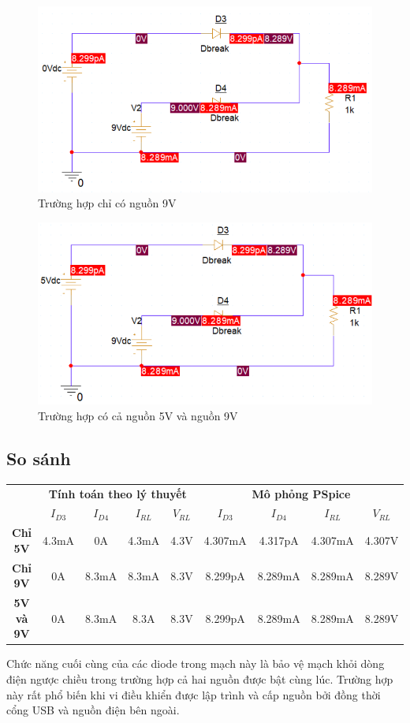 \begin{figure}[H]
    \centering
    \includegraphics[width=1\textwidth]{graphics/ex5/f3.png}
    \caption{Trường hợp chỉ có nguồn 9V}
\end{figure}

\begin{figure}[H]
    \centering
    \includegraphics[width=1\textwidth]{graphics/ex5/f4.png}
    \caption{Trường hợp có cả nguồn 5V và nguồn 9V}
\end{figure}

\subsection{So sánh}
\begin{table}[H]
    \centering
    \begin{tabular}{|c|c|c|c|c|c|c|c|c|}
        \cline{2-9}
        \multicolumn{1}{c|}{} & \multicolumn{4}{c|}{\textbf{Tính toán theo lý thuyết}} & \multicolumn{4}{c|}{\textbf{Mô phỏng PSpice}} \\ \cline{2-9}
        \multicolumn{1}{c|}{} & \(I_{D3}\) & \(I_{D4}\) & \(I_{RL}\) & \(V_{RL}\) & \(I_{D3}\) & \(I_{D4}\) & \(I_{RL}\) & \(V_{RL}\) \\ \hline
        \textbf{Chỉ 5V} & 4.3mA & 0A & 4.3mA & 4.3V & 4.307mA & 4.317pA & 4.307mA & 4.307V \\ \hline
        \textbf{Chỉ 9V} & 0A & 8.3mA & 8.3mA & 8.3V & 8.299pA & 8.289mA & 8.289mA & 8.289V \\ \hline
        \textbf{5V và 9V} & 0A & 8.3mA & 8.3A & 8.3V & 8.299pA & 8.289mA & 8.289mA & 8.289V \\ \hline
    \end{tabular}
\end{table}

Chức năng cuối cùng của các diode trong mạch này là bảo vệ mạch khỏi dòng điện ngược chiều trong trường hợp cả hai nguồn được bật cùng lúc. Trường hợp này rất phổ biến khi vi điều khiển được lập trình và cấp nguồn bởi đồng thời cổng USB và nguồn điện bên ngoài.